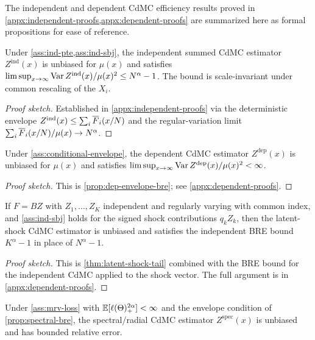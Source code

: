 The independent and dependent CdMC efficiency results proved in
\cref{appx:independent-proofs,appx:dependent-proofs} are summarized here as
formal propositions for ease of reference.

\begin{proposition}
\label{prop:ind-cdmc-bre}
Under \cref{ass:ind-pte,ass:ind-sbj}, the independent summed CdMC estimator
$Z^{\mathrm{ind}}(x)$ is unbiased for $\mu(x)$ and satisfies
\(
  \limsup_{x\to\infty}\operatorname{Var} Z^{\mathrm{ind}}(x)/\mu(x)^2\le N^\alpha-1
\).
The bound is scale-invariant under common rescaling of the $X_i$.
\end{proposition}

\begin{proof}[Proof sketch]
Established in \cref{appx:independent-proofs} via the deterministic envelope
$Z^{\mathrm{ind}}(x)\le\sum_i\overline{F}_i(x/N)$ and the regular-variation limit
$\sum_i\overline{F}_i(x/N)/\mu(x)\to N^\alpha$.
\end{proof}

\begin{proposition}
\label{prop:dep-cdmc-bre}
Under \cref{ass:conditional-envelope}, the dependent CdMC estimator
$Z^{\mathrm{dep}}(x)$ is unbiased for $\mu(x)$ and satisfies
\(\limsup_{x\to\infty}\operatorname{Var} Z^{\mathrm{dep}}(x)/\mu(x)^2<\infty\).
\end{proposition}

\begin{proof}[Proof sketch]
This is \cref{prop:dep-envelope-bre}; see \cref{appx:dependent-proofs}.
\end{proof}

\begin{proposition}
\label{prop:latent-shock-bre}
If $F=BZ$ with $Z_1,\ldots,Z_K$ independent and regularly varying with common
index, and \cref{ass:ind-sbj} holds for the signed shock contributions
$q_kZ_k$, then the latent-shock CdMC estimator is unbiased and satisfies the
independent BRE bound $K^\alpha-1$ in place of $N^\alpha-1$.
\end{proposition}

\begin{proof}[Proof sketch]
This is \cref{thm:latent-shock-tail} combined with the BRE bound for the
independent CdMC applied to the shock vector. The full argument is in
\cref{appx:dependent-proofs}.
\end{proof}

\begin{proposition}
\label{prop:spectral-cdmc-bre}
Under \cref{ass:mrv-loss} with $\mathbb{E}[\ell(\Theta)_+^{2\alpha}]<\infty$ and the
envelope condition of \cref{prop:spectral-bre}, the spectral/radial CdMC
estimator $Z^{\mathrm{spec}}(x)$ is unbiased and has bounded relative error.
\end{proposition}

